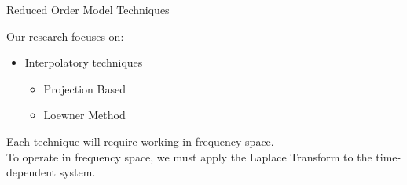 
\begin{frame}{Reduced Order Model Techniques}

Our research focuses on:
\bigskip
    \begin{itemize}
        \item <1-> Interpolatory techniques
        \begin{itemize}
            \item <1-> Projection Based
            \item <1-> Loewner Method
        \end{itemize}
    \end{itemize}
    \bigskip
    Each technique will require working in frequency space.\\
    \bigskip
    To operate in frequency space, we must apply the Laplace Transform to the time-dependent system.
\end{frame}
